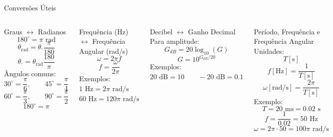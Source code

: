 \begin{frame}{Conversões Úteis}
  \scriptsize
  \begin{columns}[t]
    \begin{block}{Graus $\leftrightarrow$ Radianos}
      $$180^\circ=\pi\text{ rad}$$
      $$\theta_{\text{rad}}=\theta_{^\circ}\frac{\pi}{180}$$
      $$\theta_{^\circ}=\theta_{\text{rad}}\frac{180}{\pi}$$
      Ângulos comuns:
      $$30^\circ=\frac{\pi}{6}, \qquad 45^\circ=\frac{\pi}{4}$$
      $$60^\circ=\frac{\pi}{3}, \qquad 90^\circ=\frac{\pi}{2}$$
      $$180^\circ=\pi$$
    \end{block}
    \begin{block}{Frequência (Hz) $\leftrightarrow$ Frequência Angular (rad/s)}
      $$\omega=2\pi f$$
      $$f=\frac{\omega}{2\pi}$$
      Exemplos: \\
      $1\text{ Hz}=2\pi\text{ rad/s}$ \\
      $60\text{ Hz}=120\pi\text{ rad/s}$
    \end{block}
    \begin{block}{Decibel $\leftrightarrow$ Ganho Decimal}
      Para amplitude:
      $$G_{dB}=20\log_{10}(G)$$
      $$G=10^{G_{dB}/20}$$
      Exemplos: \\
      $20\text{ dB}=10 \qquad -20\text{ dB}=0.1$
    \end{block}
    \begin{block}{Período, Frequência e Frequência Angular}
      Unidades:
      $$T[\text{s}]$$
      $$f[\text{Hz}]=\frac{1}{T[\text{s}]}$$
      $$\omega[\text{rad/s}]=\frac{2\pi}{T[\text{s}]}$$
      Exemplo:
      $$T=20\text{ ms}=0.02\text{ s}$$
      $$f=\frac{1}{0.02}=50\text{ Hz}$$
      $$\omega=2\pi\cdot50=100\pi\text{ rad/s}$$
    \end{block}
  \end{columns}
\end{frame}
